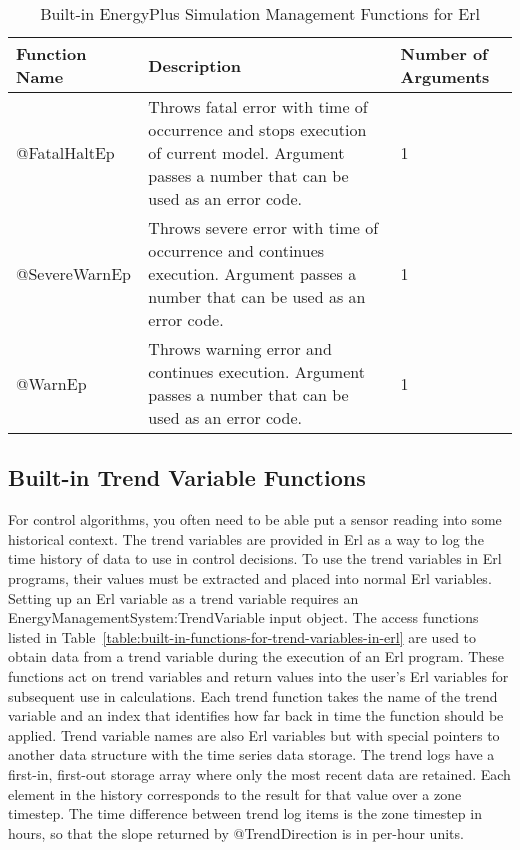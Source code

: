 \begin{longtable}[c]{p{1.5in}p{3.0in}p{1.5in}}
\caption{Built-in EnergyPlus Simulation Management Functions for Erl \protect \label{table:built-in-energyplus-simulation-management}}\\
\toprule 
Function Name & Description & Number of Arguments \tabularnewline \midrule
\endhead
@FatalHaltEp & Throws fatal error with time of occurrence and stops execution of current model. Argument passes a number that can be used as an error code. & 1 \tabularnewline
@SevereWarnEp & Throws severe error with time of occurrence and continues execution. Argument passes a number that can be used as an error code. & 1 \tabularnewline
@WarnEp & Throws warning error and continues execution. Argument passes a number that can be used as an error code. & 1 \tabularnewline
\bottomrule
\end{longtable}

\subsection{Built-in Trend Variable Functions}\label{built-in-trend-variable-functions}

For control algorithms, you often need to be able put a sensor reading into some historical context. The trend variables are provided in Erl as a way to log the time history of data to use in control decisions. To use the trend variables in Erl programs, their values must be extracted and placed into normal Erl variables. Setting up an Erl variable as a trend variable requires an EnergyManagementSystem:TrendVariable input object. The access functions listed in Table~\ref{table:built-in-functions-for-trend-variables-in-erl} are used to obtain data from a trend variable during the execution of an Erl program. These functions act on trend variables and return values into the user's Erl variables for subsequent use in calculations. Each trend function takes the name of the trend variable and an index that identifies how far back in time the function should be applied. Trend variable names are also Erl variables but with special pointers to another data structure with the time series data storage. The trend logs have a first-in, first-out storage array where only the most recent data are retained. Each element in the history corresponds to the result for that value over a zone timestep. The time difference between trend log items is the zone timestep in hours, so that the slope returned by @TrendDirection is in per-hour units.

